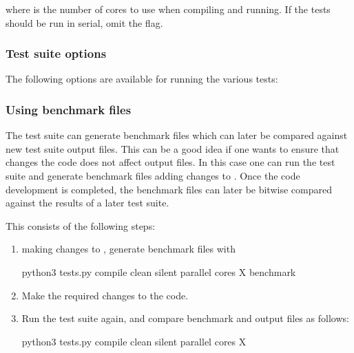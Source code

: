 \documentclass[letterpaper,10pt,english]{sphinxmanual}
\begin{document}
\sphinxAtStartPar
where  is the number of cores to use when compiling and running.
If the tests should be run in serial, omit the  flag.


\subsubsection{Test suite options}
\label{\detokenize{Contrib/CI:test-suite-options}}
\sphinxAtStartPar
The following options are available for running the various tests:


\subsubsection{Using benchmark files}
\label{\detokenize{Contrib/CI:using-benchmark-files}}
\sphinxAtStartPar
The test suite can generate benchmark files which can later be compared against new test suite output files.
This can be a good idea if one wants to ensure that changes the  code does not affect output files.
In this case one can run the test suite and generate benchmark files  adding changes to .
Once the code development is completed, the benchmark files can later be bit\sphinxhyphen{}wise compared against the results of a later test suite.

\sphinxAtStartPar
This consists of the following steps:
\begin{enumerate}
%
\item {} 
\sphinxAtStartPar
{} making changes to , generate benchmark files with

\begin{sphinxVerbatim}[commandchars=\\\{\},formatcom=\scriptsize]
python3 tests.py \PYGZhy{}\PYGZhy{}compile \PYGZhy{}\PYGZhy{}clean \PYGZhy{}\PYGZhy{}silent \PYGZhy{}\PYGZhy{}parallel \PYGZhy{}cores X \PYGZhy{}\PYGZhy{}benchmark
\end{sphinxVerbatim}

\item {} 
\sphinxAtStartPar
Make the required changes to the  code.

\item {} 
\sphinxAtStartPar
Run the test suite again, and compare benchmark and output files as follows:

\begin{sphinxVerbatim}[commandchars=\\\{\},formatcom=\scriptsize]
python3 tests.py \PYGZhy{}\PYGZhy{}compile \PYGZhy{}\PYGZhy{}clean \PYGZhy{}\PYGZhy{}silent \PYGZhy{}\PYGZhy{}parallel \PYGZhy{}cores X
\end{sphinxVerbatim}

\end{enumerate}
\end{document}
